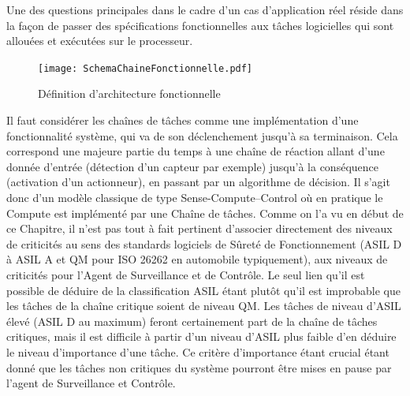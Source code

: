 \documentclass[french, a4paper, 11pt, twoside, pdftex]{StyleThese}
\begin{document}
    	
        
		Une des questions principales dans le cadre d'un cas d'application réel réside dans la façon de passer des spécifications fonctionnelles aux tâches logicielles qui sont allouées et exécutées sur le processeur.
		
		\begin{figure}[h!]
			\centering
			\texttt{[image: SchemaChaineFonctionnelle.pdf]}
			\caption{Définition d'architecture fonctionnelle}
			\label{fig:funcArch}
		\end{figure}
	
		Il faut considérer les chaînes de tâches comme une implémentation d'une fonctionnalité système, qui va de son déclenchement jusqu'à sa terminaison. Cela correspond une majeure partie du temps à une chaîne de réaction allant d'une donnée d'entrée (détection d'un capteur par exemple) jusqu'à la conséquence (activation d'un actionneur), en passant par un algorithme de décision. Il s'agit donc d'un modèle classique de type Sense-Compute--Control où en pratique le Compute est implémenté par une Chaîne de tâches.
		Comme on l'a vu en début de ce Chapitre, il n'est pas tout à fait pertinent d'associer directement des niveaux de criticités au sens des standards logiciels de Sûreté de Fonctionnement (ASIL D à ASIL A et QM pour ISO 26262 en automobile typiquement), aux niveaux de criticités pour l'Agent de Surveillance et de Contrôle. Le seul lien qu'il est possible de déduire de la classification ASIL étant plutôt qu'il est improbable que les tâches de la chaîne critique soient de niveau QM. Les tâches de niveau d'ASIL élevé (ASIL D au maximum) feront certainement part de la chaîne de tâches critiques, mais il est difficile à partir d'un niveau d'ASIL plus faible d'en déduire le niveau d'importance d'une tâche. Ce critère d'importance étant crucial étant donné que les tâches non critiques du système pourront être mises en pause par l'agent de Surveillance et Contrôle.
		
\end{document}
